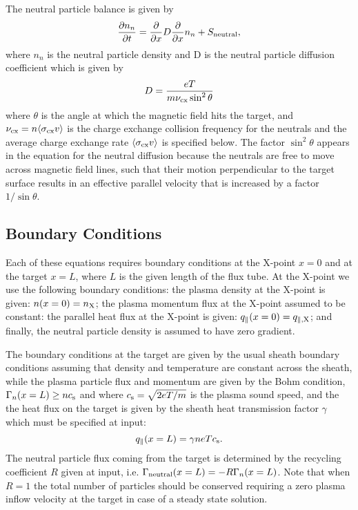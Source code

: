 \documentclass[amsmath,amssymb,a4]{revtex4}
\begin{document}
\noindent The neutral particle balance is given by
\begin{equation}\label{neutral_particle_balance}
    {\partial n_n \over \partial t} = {\partial \over \partial x} D {\partial \over \partial x} n_n + S_{\rm neutral},
\end{equation}
where $n_n$ is the neutral particle density and D is the neutral particle diffusion coefficient which is given by \cite{nakazawa2000}
\begin{equation}\label{neutral_diffusion_coefficient}
    D = { eT \over m \nu_{\rm cx} \sin^2\theta }
\end{equation}
where $\theta$ is the angle at which the magnetic field hits the target, and $\nu_{\rm cx} = n \langle\sigma_{\rm cx} v\rangle$ is the charge exchange collision frequency for the neutrals and the average charge exchange rate $\langle\sigma_{\rm cx} v\rangle$ is specified below. The factor $\sin^2\theta$ appears in the equation for the neutral diffusion because the neutrals are free to move across magnetic field lines, such that their motion perpendicular to the target surface results in an effective parallel velocity that is increased by a factor $1/\sin\theta$.


\subsection{Boundary Conditions}

Each of these equations requires boundary conditions at the X-point $x=0$ and at the target $x=L$, where $L$ is the given length of the flux tube. At the X-point we use the following boundary conditions:
the plasma density at the X-point is given: $n(x=0) = n_{\rm X}$; the plasma momentum flux at the X-point assumed to be constant: the parallel heat flux at the X-point is given:  $q_\parallel(x=0) = q_{\parallel,\rm X}$; and finally, the neutral particle density is assumed to have zero gradient.

The boundary conditions at the target are given by the usual sheath boundary conditions assuming that density and temperature are constant across the sheath, while the plasma particle flux and momentum are given by the Bohm condition, $\Gamma_n(x=L) \ge n c_{\rm s}$ and  where $c_{\rm s} = \sqrt{2eT/m}$ is the plasma sound speed, and the the heat flux on the target is given by the sheath heat transmission factor $\gamma$ which must be specified at input:
\begin{equation}\label{sheath_heat_transmission}
    q_\parallel(x=L) = \gamma n e T c_{\rm s}.
\end{equation}
The neutral particle flux coming from the target is determined by the recycling coefficient $R$ given at input, i.e. $\Gamma_{\rm neutral}(x=L) = - R \Gamma_n(x=L)$. Note that when $R=1$ the total number of particles should be conserved requiring a zero plasma inflow velocity at the target in case of a steady state solution.
\end{document}

